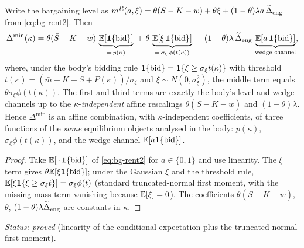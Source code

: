 \begin{proposition}
\label{prop:bg-levelshape}
Write the bargaining level as
$m^{R}(a,\xi)=\theta(\bar S-K-w)+\theta\xi+(1-\theta)\lambda a\,\widetilde{\Delta}_{\mathrm{eng}}$
from \eqref{eq:bg-rent2}. Then
\begin{equation}
  \label{eq:bg-Dmin-decomp}
  \Delta^{\min}(\kappa)
   = \theta(\bar S-K-w)\,\underbrace{\mathbb{E}[\mathbf{1}\{\mathrm{bid}\}]}_{=\,p(\kappa)}
   \;+\; \theta\,\underbrace{\mathbb{E}[\xi\,\mathbf{1}\{\mathrm{bid}\}]}_{=\,\sigma_\xi\,\phi(t(\kappa))}
   \;+\; (1-\theta)\lambda\,\widetilde{\Delta}_{\mathrm{eng}}\,\underbrace{\mathbb{E}[a\,\mathbf{1}\{\mathrm{bid}\}]}_{\text{wedge channel}} ,
\end{equation}
where, under the body's bidding rule
$\mathbf{1}\{\mathrm{bid}\}=\mathbf{1}\{\xi\ge\sigma_\xi t(\kappa)\}$ with threshold
$t(\kappa)=(\bar m+K-\bar S+P(\kappa))/\sigma_\xi$ and $\xi\sim N(0,\sigma_\xi^2)$,
the middle term equals $\theta\sigma_\xi\phi(t(\kappa))$. The first and third
terms are exactly the body's level and wedge channels up to the
$\kappa$-\emph{independent} affine rescalings $\theta(\bar S-K-w)$ and
$(1-\theta)\lambda$. Hence $\Delta^{\min}$ is an affine combination, with
$\kappa$-independent coefficients, of three functions of the \emph{same}
equilibrium objects analysed in the body: $p(\kappa)$, $\sigma_\xi\phi(t(\kappa))$,
and the wedge channel $\mathbb{E}[a\mathbf{1}\{\mathrm{bid}\}]$.
\end{proposition}
\begin{proof}
Take $\mathbb{E}[\,\cdot\,\mathbf{1}\{\mathrm{bid}\}]$ of \eqref{eq:bg-rent2} for $a\in\{0,1\}$
and use linearity. The $\xi$ term gives $\theta\mathbb{E}[\xi\mathbf{1}\{\mathrm{bid}\}]$; under
the Gaussian $\xi$ and the threshold rule,
$\mathbb{E}[\xi\mathbf{1}\{\xi\ge\sigma_\xi t\}]=\sigma_\xi\phi(t)$ (standard truncated-normal
first moment, with the missing-mass term vanishing because $\mathbb{E}[\xi]=0$). The
coefficients $\theta(\bar S-K-w)$, $\theta$, $(1-\theta)\lambda\widetilde{\Delta}_{\mathrm{eng}}$
are constants in $\kappa$.
\end{proof}

\noindent\emph{Status: proved} (linearity of the conditional expectation plus the
truncated-normal first moment).

